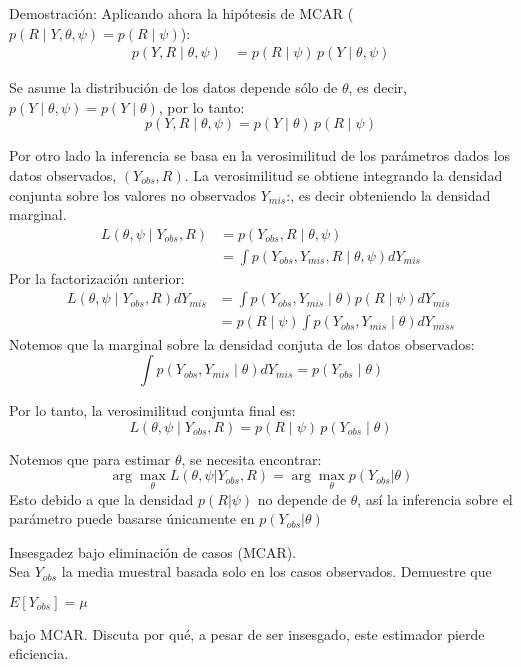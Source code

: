 \documentclass[a4paper,11pt]{article}
\begin{document}
\begin{demostracion}{Demostración:}
    Aplicando ahora la hipótesis de MCAR ($p(R \mid Y, \theta, \psi) = p(R \mid \psi)$):
    \begin{align*}
        p(Y, R \mid \theta, \psi) & = p(R \mid \psi) \, p(Y \mid \theta, \psi)
    \end{align*}

    Se asume la distribución de los datos depende sólo de $\theta$, es decir, $p(Y \mid \theta, \psi) = p(Y \mid \theta)$, por lo tanto:
    \[
        p(Y, R \mid \theta, \psi) = p(Y \mid \theta) \, p(R \mid \psi)
    \]

    Por otro lado la inferencia se basa en la verosimilitud de los parámetros dados los datos observados, $(Y_{obs}, R)$. La verosimilitud se obtiene integrando la densidad conjunta sobre los valores no observados $Y_{mis}$:, es decir obteniendo la densidad marginal.
    \begin{align*}
        L(\theta, \psi \mid Y_{obs}, R) & = p(Y_{obs}, R \mid \theta, \psi)                         \\
                                        & = \int p(Y_{obs}, Y_{mis}, R \mid \theta, \psi)  dY_{mis}
    \end{align*}
    Por la factorización anterior:
    \begin{align*}
        L(\theta, \psi \mid Y_{obs}, R)   dY_{mis} & = \int p(Y_{obs}, Y_{mis} \mid \theta) p(R \mid \psi)  dY_{mis} \\
                                                   & = p(R \mid \psi) \int p(Y_{obs}, Y_{mis} \mid \theta)dY_{miss}
    \end{align*}
    Notemos que la marginal sobre la densidad conjuta de los datos observados:
    \[
        \int p(Y_{obs}, Y_{mis} \mid \theta)  dY_{mis} = p(Y_{obs} \mid \theta)
    \]

    Por lo tanto, la verosimilitud conjunta final es:
    \[
        L(\theta, \psi \mid Y_{obs}, R) = p(R \mid \psi) \, p(Y_{obs} \mid \theta)
    \]

    Notemos que para estimar $\theta$, se necesita encontrar:
    \[
        \arg \max_\theta{L(\theta,\psi| Y_{obs},R )}=
        \arg \max_\theta{p( Y_{obs}|\theta )}
    \]
    Esto debido a que la densidad $p(R|\psi)$ no depende de $\theta$, así la inferencia sobre el parámetro puede basarse únicamente en $p(Y_{obs}|\theta )$
\end{demostracion}
\newpage
\begin{ejercicio}{5}
    Insesgadez bajo eliminación de casos (MCAR).\\
    Sea $Y_{obs}$ la media muestral basada solo en los casos observados. Demuestre que

    $E[Y_{obs}] = \mu$

    bajo MCAR. Discuta por qué, a pesar de ser insesgado, este estimador pierde eficiencia.
\end{ejercicio}
\end{document}
